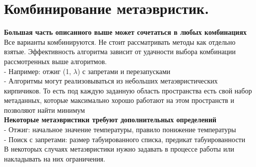 \section{Комбинирование метаэвристик.}
\textbf{Большая часть описанного выше может сочетаться в любых комбинациях}\\

Все варианты комбинируются. Не стоит рассматривать методы как отдельно взятые. Эффективность алгоритма зависит от удачности выбора комбинации рассмотренных выше алгоритмов.\\

- Например: отжиг (1, $\lambda$) с запретами и перезапусками \\
- Алгоритмы могут реализовываться из небольших метаэвристических кирпичиков. То есть под каждую заданную область пространства есть свой набор метаданных, которые максимально хорошо работают на этом пространств и позволяют найти минимум\\

\textbf{Некоторые метаэвристики требуют дополнительных определений}\\ 
- Отжиг: начальное значение температуры, правило понижение температуры\\
- Поиск с запретами: размер табуированного списка, предикат табуированности\\
В некоторых случаях метаэвристики нужно задавать в процессе работы или накладывать на них ограничения. \\

